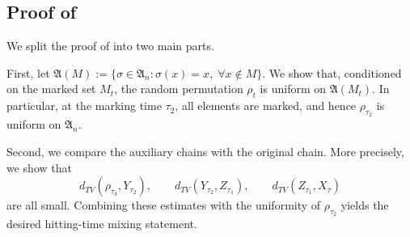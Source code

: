 \subsection{Proof of }


We split the proof of  into two main parts. 


First, let $\mathfrak{A}(M):=\{\sigma\in \mathfrak{A}_n:\sigma(x)=x,\;\forall x\notin M\}$. We show that, conditioned on the marked set \(M_t\), the random permutation \(\rho_t\) is uniform on \(\mathfrak A(M_t)\). In particular, at the marking time \(\tau_2\), all elements are marked, and hence \(\rho_{\tau_2}\) is uniform on \(\mathfrak A_n\).

Second, we compare the auxiliary chains with the original chain. More precisely, we show that
\[
    d_{TV}(\rho_{\tau_3},Y_{\tau_2}),\qquad
    d_{TV}(Y_{\tau_2},Z_{\tau_1}),\qquad
    d_{TV}(Z_{\tau_1},X_{\tau})
\]
are all small. Combining these estimates with the uniformity of \(\rho_{\tau_2}\) yields the desired hitting-time mixing statement.


